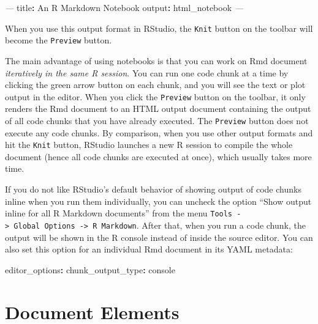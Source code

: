 \documentclass[
  11pt,
]{krantz}
\newenvironment{Shaded}{\begin{snugshade}}{\end{snugshade}}
\newcommand{\AttributeTok}[1]{\textcolor[rgb]{0.61,0.61,0.61}{#1}}
\newcommand{\FunctionTok}[1]{\textcolor[rgb]{0,0,0}{#1}}
\newcommand{\KeywordTok}[1]{\textcolor[rgb]{0.27,0.27,0.27}{\textbf{#1}}}
\newcommand{\PreprocessorTok}[1]{\textcolor[rgb]{0.37,0.37,0.37}{\textit{#1}}}
\begin{document}
\begin{Shaded}
\begin{Highlighting}[]
\PreprocessorTok{---}
\FunctionTok{title}\KeywordTok{:}\AttributeTok{ An R Markdown Notebook}
\FunctionTok{output}\KeywordTok{:}\AttributeTok{ html_notebook}
\PreprocessorTok{---}
\end{Highlighting}
\end{Shaded}

When you use this output format in RStudio, the \texttt{Knit} button on the toolbar will become the \texttt{Preview} button.

The main advantage of using notebooks is that you can work on Rmd document \emph{iteratively in the same R session}. You can run one code chunk at a time by clicking the green arrow button on each chunk, and you will see the text or plot output in the editor. When you click the \texttt{Preview} button on the toolbar, it only renders the Rmd document to an HTML output document containing the output of all code chunks that you have already executed. The \texttt{Preview} button does not execute any code chunks. By comparison, when you use other output formats and hit the \texttt{Knit} button, RStudio launches a new R session to compile the whole document (hence all code chunks are executed at once), which usually takes more time.

If you do not like RStudio's default behavior of showing output of code chunks inline when you run them individually, you can uncheck the option ``Show output inline for all R Markdown documents'' from the menu \texttt{Tools\ -\textgreater{}\ Global\ Options\ -\textgreater{}\ R\ Markdown}. After that, when you run a code chunk, the output will be shown in the R console instead of inside the source editor. You can also set this option for an individual Rmd document in its YAML metadata:

\begin{Shaded}
\begin{Highlighting}[]
\FunctionTok{editor_options}\KeywordTok{:}
\AttributeTok{  }\FunctionTok{chunk_output_type}\KeywordTok{:}\AttributeTok{ console}
\end{Highlighting}
\end{Shaded}

\hypertarget{document-elements}{%
\chapter{Document Elements}\label{document-elements}}
\end{document}

